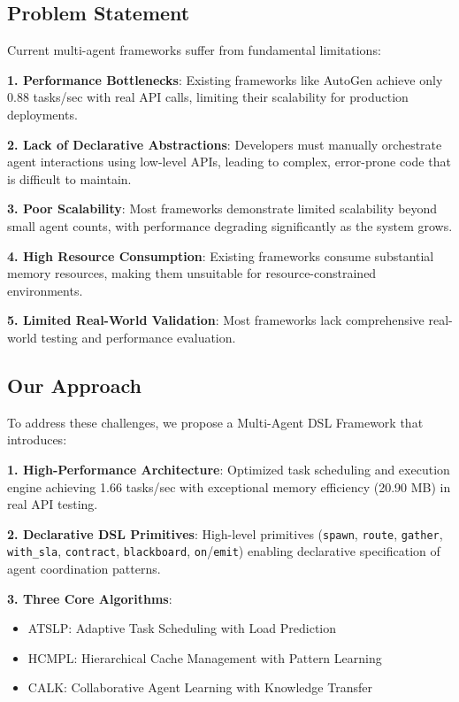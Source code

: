 \documentclass[conference]{IEEEtran}
\begin{document}
\subsection{Problem Statement}

Current multi-agent frameworks suffer from fundamental limitations:

\textbf{1. Performance Bottlenecks}: Existing frameworks like AutoGen achieve only 0.88 tasks/sec with real API calls, limiting their scalability for production deployments.

\textbf{2. Lack of Declarative Abstractions}: Developers must manually orchestrate agent interactions using low-level APIs, leading to complex, error-prone code that is difficult to maintain.

\textbf{3. Poor Scalability}: Most frameworks demonstrate limited scalability beyond small agent counts, with performance degrading significantly as the system grows.

\textbf{4. High Resource Consumption}: Existing frameworks consume substantial memory resources, making them unsuitable for resource-constrained environments.

\textbf{5. Limited Real-World Validation}: Most frameworks lack comprehensive real-world testing and performance evaluation.

\subsection{Our Approach}

To address these challenges, we propose a Multi-Agent DSL Framework that introduces:

\textbf{1. High-Performance Architecture}: Optimized task scheduling and execution engine achieving 1.66 tasks/sec with exceptional memory efficiency (20.90 MB) in real API testing.

\textbf{2. Declarative DSL Primitives}: High-level primitives (\texttt{spawn}, \texttt{route}, \texttt{gather}, \texttt{with\_sla}, \texttt{contract}, \texttt{blackboard}, \texttt{on}/\texttt{emit}) enabling declarative specification of agent coordination patterns.

\textbf{3. Three Core Algorithms}: 
   \begin{itemize}
   \item ATSLP: Adaptive Task Scheduling with Load Prediction
   \item HCMPL: Hierarchical Cache Management with Pattern Learning  
   \item CALK: Collaborative Agent Learning with Knowledge Transfer
   \end{itemize}
\end{document}

